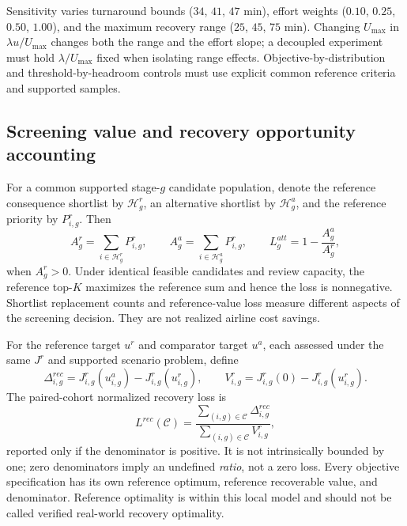 \documentclass[10pt,a4paper]{article}
\numberwithin{equation}{section}
\begin{document}
Sensitivity varies turnaround bounds ($34$, $41$, $47$ min), effort weights ($0.10$, $0.25$, $0.50$, $1.00$), and the maximum recovery range ($25$, $45$, $75$ min). Changing $U_{\max}$ in $\lambda u/U_{\max}$ changes both the range and the effort slope; a decoupled experiment must hold $\lambda/U_{\max}$ fixed when isolating range effects. Objective-by-distribution and threshold-by-headroom controls must use explicit common reference criteria and supported samples.

\subsection{Screening value and recovery opportunity accounting}
For a common supported stage-$g$ candidate population, denote the reference consequence shortlist by $\mathcal H_g^r$, an alternative shortlist by $\mathcal H_g^a$, and the reference priority by
$P^r_{i,g}$. Then
\begin{equation}
A_g^r=\sum_{i\in\mathcal H_g^r}P^r_{i,g},\qquad
A_g^a=\sum_{i\in\mathcal H_g^a}P^r_{i,g},\qquad
L_g^{att}=1-\frac{A_g^a}{A_g^r},
\label{eq:sup_stage1_loss}
\end{equation}
when $A_g^r>0$. Under identical feasible candidates and review capacity, the reference top-$K$ maximizes the reference sum and hence the loss is nonnegative. Shortlist replacement counts and reference-value loss measure different aspects of the screening decision. They are not realized airline cost savings.

For the reference target $u^r$ and comparator target $u^a$, each assessed under the same $J^r$ and supported scenario problem, define
\begin{equation}
\Delta^{rec}_{i,g}=J^r_{i,g}(u^a_{i,g})-J^r_{i,g}(u^r_{i,g}),\qquad
V^r_{i,g}=J^r_{i,g}(0)-J^r_{i,g}(u^r_{i,g}).
\label{eq:sup_regret_value}
\end{equation}
The paired-cohort normalized recovery loss is
\begin{equation}
L^{rec}(\mathcal C)=
\frac{\sum_{(i,g)\in\mathcal C}\Delta^{rec}_{i,g}}
{\sum_{(i,g)\in\mathcal C}V^r_{i,g}},
\label{eq:sup_recovery_loss}
\end{equation}
reported only if the denominator is positive. It is not intrinsically bounded by one; zero denominators imply an undefined \emph{ratio},
not a zero loss. Every objective specification has its own reference optimum, reference recoverable value, and denominator. Reference optimality is within this local model and should not be called verified real-world recovery optimality.
\end{document}
